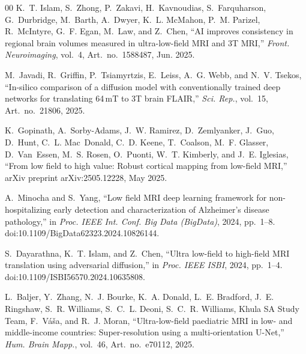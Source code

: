 \documentclass[12pt,a4paper]{article}
\begin{document}
\begin{thebibliography}{00}
K.~T. Islam, S.~Zhong, P.~Zakavi, H.~Kavnoudias, S.~Farquharson,
G.~Durbridge, M.~Barth, A.~Dwyer, K.~L. McMahon, P.~M. Parizel,
R.~McIntyre, G.~F. Egan, M.~Law, and Z.~Chen,
``AI improves consistency in regional brain volumes measured in
ultra-low-field MRI and 3T MRI,''
\emph{Front. Neuroimaging}, vol.~4, Art.~no.~1588487, Jun. 2025.

M.~Javadi, R.~Griffin, P.~Tsiamyrtzis, E.~Leiss, A.~G. Webb,
and N.~V. Tsekos,
``In-silico comparison of a diffusion model with conventionally trained
deep networks for translating 64\,mT to 3T brain FLAIR,''
\emph{Sci. Rep.}, vol.~15, Art.~no.~21806, 2025.

K.~Gopinath, A.~Sorby-Adams, J.~W. Ramirez, D.~Zemlyanker,
J.~Guo, D.~Hunt, C.~L. Mac~Donald, C.~D. Keene, T.~Coalson,
M.~F. Glasser, D.~Van~Essen, M.~S. Rosen, O.~Puonti,
W.~T. Kimberly, and J.~E. Iglesias,
``From low field to high value: Robust cortical mapping from
low-field MRI,''
arXiv preprint arXiv:2505.12228, May 2025.

A.~Minocha and S.~Yang,
``Low field MRI deep learning framework for non-hospitalizing early
detection and characterization of Alzheimer's disease pathology,''
in \emph{Proc. IEEE Int. Conf. Big Data (BigData)}, 2024,
pp.~1--8. doi:10.1109/BigData62323.2024.10826144.

S.~Dayarathna, K.~T. Islam, and Z.~Chen,
``Ultra low-field to high-field MRI translation using adversarial
diffusion,''
in \emph{Proc. IEEE ISBI}, 2024, pp.~1--4.
doi:10.1109/ISBI56570.2024.10635808.

L.~Baljer, Y.~Zhang, N.~J. Bourke, K.~A. Donald, L.~E. Bradford,
J.~E. Ringshaw, S.~R. Williams, S.~C.~L. Deoni, S.~C.~R. Williams,
Khula SA Study Team, F.~V{\'a}{\v s}a, and R.~J. Moran,
``Ultra-low-field paediatric MRI in low- and middle-income countries:
Super-resolution using a multi-orientation {U-Net},''
\emph{Hum. Brain Mapp.}, vol.~46, Art.~no.~e70112, 2025.

\end{thebibliography}
\end{document}
